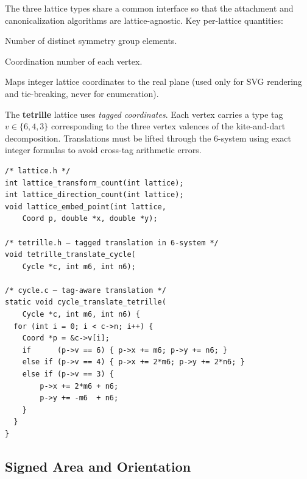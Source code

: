 \documentclass[10pt,a4paper]{article}
\newcommand{\file}[1]{\texttt{\footnotesize #1}}
\begin{document}
\begin{tcolorbox}[dualbox, title={Lattice Abstraction --- \file{src/core/lattice.h}, \file{tetrille.h}}]
  The three lattice types share a common interface so that the
  attachment and canonicalization algorithms are lattice-agnostic.
  Key per-lattice quantities:

  \begin{description}[leftmargin=0pt]
    \item[Transform count] Number of distinct symmetry group elements.
    \item[Direction count] Coordination number of each vertex.
    \item[Embed point] Maps integer lattice coordinates to the real
      plane (used only for SVG rendering and tie-breaking, never for
      enumeration).
  \end{description}

  The \textbf{tetrille} lattice uses \emph{tagged coordinates}.
  Each vertex carries a type tag $v \in \{6, 4, 3\}$
  corresponding to the three vertex valences of the kite-and-dart
  decomposition.  Translations must be lifted through the 6-system
  using exact integer formulas to avoid cross-tag arithmetic errors.
\tcblower
\begin{verbatim}
/* lattice.h */
int lattice_transform_count(int lattice);
int lattice_direction_count(int lattice);
void lattice_embed_point(int lattice,
    Coord p, double *x, double *y);

/* tetrille.h — tagged translation in 6-system */
void tetrille_translate_cycle(
    Cycle *c, int m6, int n6);

/* cycle.c — tag-aware translation */
static void cycle_translate_tetrille(
    Cycle *c, int m6, int n6) {
  for (int i = 0; i < c->n; i++) {
    Coord *p = &c->v[i];
    if      (p->v == 6) { p->x += m6; p->y += n6; }
    else if (p->v == 4) { p->x += 2*m6; p->y += 2*n6; }
    else if (p->v == 3) {
        p->x += 2*m6 + n6;
        p->y += -m6  + n6;
    }
  }
}
\end{verbatim}
\end{tcolorbox}

\subsection{Signed Area and Orientation}
\end{document}
